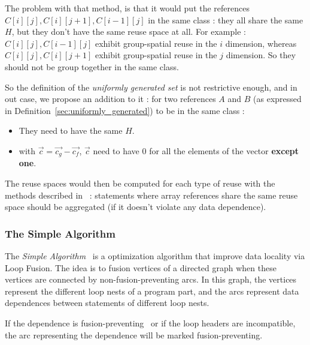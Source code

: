 \documentclass[paper=a4, fontsize=11pt]{scrartcl}
\numberwithin{equation}{section}        %
\numberwithin{figure}{section}          %
\numberwithin{table}{section}               %
\begin{document}
            The problem with that method, is that it would put the references
            $C[i][j],C[i][j+1],C[i-1][j]$ in the same class : they all share the
            same $H$, but they don't have the same reuse space at all.
            For example : $C[i][j],C[i-1][j]$ exhibit group-spatial reuse in the $i$ dimension,
            whereas $C[i][j],C[i][j+1]$ exhibit group-spatial reuse in the $j$ dimension. So they
            should not be group together in the same class.
            \medskip

            So the definition of the \textit{uniformly generated set} is not restrictive enough,
            and in out case, we propose an addition to it : for two references $A$ and
            $B$ (as expressed in Definition~\ref{sec:uniformly_generated}) to be in the same class :
            \begin{itemize}
                \item They need to have the same $H$.
                \item with $\vec{c}=\vec{c_g} - \vec{c_f}$, $\vec{c}$ need to have $0$
                    for all the elements of the vector \textbf{except one}.
            \end{itemize}


            The reuse spaces would then be computed for each type of reuse
            with the methods described in~\cite{Wolf'91} : statements where
            array references share the same reuse space should be aggregated (if
            it doesn't violate any data dependence).



        \subsubsection{The Simple Algorithm}
            The \textit{Simple Algorithm}~\cite{Kennedy94maximizingloop} is a
            optimization algorithm that improve data locality via Loop Fusion.
            The idea is to fusion vertices of a directed graph when these vertices
            are connected by non-fusion-preventing arcs.
            In this graph, the vertices represent the different loop nests of a program part,
            and the arcs represent data dependences between statements of different loop nests.

            If the dependence is fusion-preventing~\cite{Bacon:1994:CTH:197405.197406} or if the loop headers are incompatible,
            the arc representing the dependence will be marked fusion-preventing.
\end{document}
